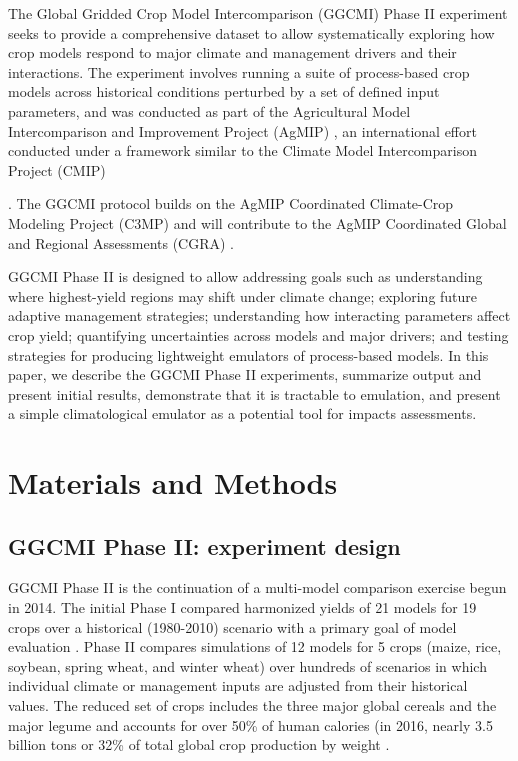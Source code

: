 \documentclass[preprint, 5p, times, twocolumn]{elsarticle}
\begin{document}
The Global Gridded Crop Model Intercomparison (GGCMI) Phase II experiment seeks to provide a comprehensive dataset to allow systematically exploring how crop models respond to major climate and management drivers and their interactions. The experiment involves running a suite of process-based crop models across historical conditions perturbed by a set of defined input parameters, and was conducted as part of the Agricultural Model Intercomparison and Improvement Project (AgMIP) \citep{ROSENZWEIG2013, Rosenzweig2014}, an international effort conducted under a framework similar to the Climate Model Intercomparison Project (CMIP) {\citep{Taylor2012, Eyring2016}. The GGCMI protocol builds on the AgMIP Coordinated Climate-Crop Modeling Project (C3MP) \citep{ruane2014, mcdermid2015} and will contribute to the AgMIP Coordinated Global and Regional Assessments (CGRA) \citep{ruane2018, rosenzweig2018}. 

GGCMI Phase II is designed to allow addressing goals such as understanding where highest-yield regions may shift under climate change; exploring future adaptive management strategies; understanding how interacting parameters affect crop yield; quantifying uncertainties across models and major drivers; and testing strategies for producing lightweight emulators of process-based models. In this paper, we describe the GGCMI Phase II experiments, summarize output and present initial results, demonstrate that it is tractable to emulation, and present a simple climatological emulator as a potential tool for impacts assessments.

\section{Materials and Methods}
\label{S:2}
\subsection{GGCMI Phase II: experiment design}
GGCMI Phase II is the continuation of a multi-model comparison exercise begun in 2014. The initial Phase I compared harmonized yields of 21 models for 19 crops over a historical (1980-2010) scenario with a primary goal of model evaluation \citep{Elliott2015, muller_global_2017}. Phase II compares simulations of 12 models for 5 crops (maize, rice, soybean, spring wheat, and winter wheat) over hundreds of scenarios in which individual climate or management inputs are adjusted from their historical values. The reduced set of crops includes the three major global cereals and the major legume and accounts for over 50\% of human calories (in 2016, nearly 3.5 billion tons or 32\% of total global crop production by weight \citep{FAOSTAT}. 

}
\end{document}
